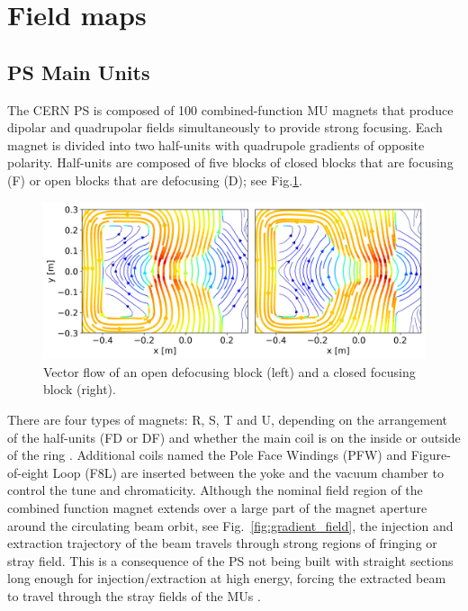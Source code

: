 \documentclass[a4paper,
               biblatex,     %
               keeplastbox,   %
               ]{jacow}
\begin{document}
\section{Field maps}
\subsection{PS Main Units}
The CERN PS is composed of 100 combined-function MU magnets that produce dipolar and quadrupolar fields simultaneously to provide strong focusing. Each magnet is divided into two half-units with quadrupole gradients of opposite polarity. Half-units are composed of five blocks of closed blocks that are focusing (F) or open blocks that are defocusing (D); see Fig.\ref{fig:streamplot}.

\begin{figure}[!htb]
   \centering
   \includegraphics*[width=1.0\columnwidth]{streamplot_defocusing_focusing.png}
   \caption{Vector flow of an open defocusing block (left) and a closed focusing block (right).}
   \label{fig:streamplot}
\end{figure}

There are four types of magnets: R, S, T and U, depending on the arrangement of the half-units (FD or DF) and whether the main coil is on the inside or outside of the ring \cite{steerenberg_fifty_2011}. Additional coils named the Pole Face Windings (PFW) and Figure-of-eight Loop (F8L) are inserted between the yoke and the vacuum chamber to control the tune and chromaticity. Although the nominal field region of the combined function magnet extends over a large part of the magnet aperture around the circulating beam orbit, see Fig.~\ref{fig:gradient_field}, the injection and extraction trajectory of the beam travels through strong regions of fringing or stray field. This is a consequence of the PS not being built with straight sections long enough for injection/extraction at high energy, forcing the extracted beam to travel through the stray fields of the MUs \cite{risselada_beam_nodate}.
\end{document}
